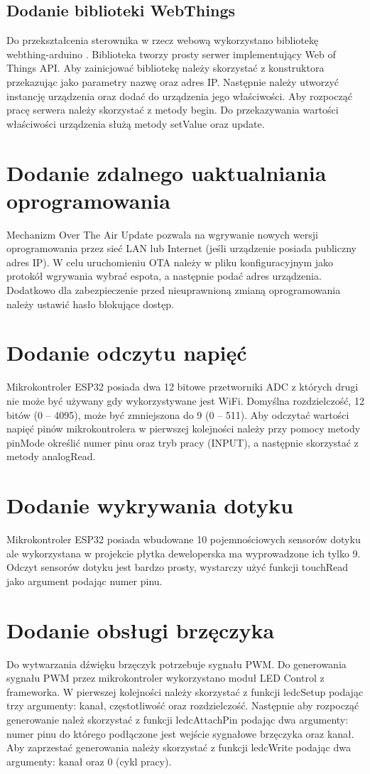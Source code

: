 \documentclass[11pt]{report}
\begin{document}
 \subsection{Dodanie biblioteki WebThings}
 Do przekształcenia sterownika w rzecz webową wykorzystano bibliotekę webthing-arduino \cite{webthinglibrary}. Biblioteka tworzy prosty serwer implementujący Web of Things API.
 Aby zainicjować bibliotekę należy skorzystać z konstruktora przekazując jako parametry nazwę oraz adres IP. Następnie należy utworzyć instancję urządzenia oraz dodać do urządzenia jego właściwości. Aby rozpocząć pracę serwera należy skorzystać z metody begin. Do przekazywania wartości właściwości urządzenia służą metody setValue oraz update.
 
 \section{Dodanie zdalnego uaktualniania oprogramowania}
 Mechanizm Over The Air Update pozwala na wgrywanie nowych wersji oprogramowania przez sieć LAN lub Internet (jeśli urządzenie posiada publiczny adres IP). W celu uruchomieniu OTA należy w pliku konfiguracyjnym jako protokół wgrywania wybrać espota, a następnie podać adres urządzenia. Dodatkowo dla zabezpieczenie przed nieuprawnioną zmianą oprogramowania należy ustawić hasło blokujące dostęp.
 
 \section{Dodanie odczytu napięć}
 Mikrokontroler ESP32 posiada dwa 12 bitowe przetworniki ADC z których drugi nie może być używany gdy wykorzystywane jest WiFi. Domyślna rozdzielczość, 12 bitów (0 – 4095), może być zmniejszona do 9 (0 – 511).
 Aby odczytać wartości napięć pinów mikrokontrolera w pierwszej kolejności należy przy pomocy metody pinMode określić numer pinu oraz tryb pracy (INPUT), a następnie skorzystać z metody analogRead.
 
 \section{Dodanie wykrywania dotyku}
 Mikrokontroler ESP32 posiada wbudowane 10 pojemnościowych sensorów dotyku ale wykorzystana w projekcie płytka deweloperska ma wyprowadzone ich tylko 9. Odczyt sensorów dotyku jest bardzo prosty, wystarczy użyć funkcji touchRead jako argument podając numer pinu.
 
 \section{Dodanie obsługi brzęczyka}
 Do wytwarzania dźwięku brzęczyk potrzebuje sygnału PWM. Do generowania sygnału PWM przez mikrokontroler wykorzystano moduł LED Control z frameworka. W pierwszej kolejności należy skorzystać z funkcji ledcSetup podając trzy argumenty: kanał, częstotliwość oraz rozdzielczość. Następnie aby rozpocząć generowanie należ skorzystać z funkcji ledcAttachPin podając dwa argumenty: numer pinu do którego podłączone jest wejście sygnałowe brzęczyka oraz kanał.
 Aby zaprzestać generowania należy skorzystać z funkcji ledcWrite podając dwa argumenty: kanał oraz 0 (cykl pracy).
 
\end{document}
